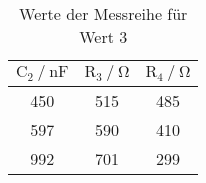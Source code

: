 \begin{table}[H]
  \centering
  \caption{Werte der Messreihe für Wert 3}
  \label{tab:tabe3}
    \begin{tabular}{c c c}
    \toprule
    $ \text{C}_2 \: / \: \si{\nano\farad} $ & $\text{R}_3 \: / \: \si{\ohm} $ &
    $\text{R}_4 \: / \: \si{\ohm} $ \\
    \midrule
    450 & 515 & 485 \\
    597 & 590 & 410 \\
    992 & 701 & 299 \\
    \bottomrule
    \end{tabular}
\end{table}
